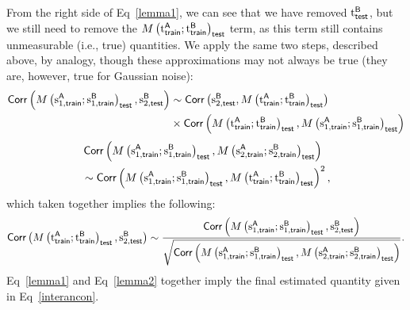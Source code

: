 From the right side of Eq~\eqref{lemma1}, we can see that we have removed $\trueBtest$, but we still need to remove the $M\left(\trueA;\trueB\right)_{\test}$ term, as this term still contains unmeasurable (i.e., true) quantities.
We apply the same two steps, described above, by analogy, though these approximations may not always be true (they are, however, true for Gaussian noise):
\begin{equation*}
\begin{split}
\corr\left(M\left(\sfAtrain;\sfBtrain\right)_{\test}, \ssBtest\right) & \sim \corr\left(\ssBtest, M\left(\trueA;\trueB\right)_{\test}\right) \\
& \times \corr\left(M\left(\trueA;\trueB\right)_{\test}, M\left(\sfAtrain;\sfBtrain\right)_{\test}\right)
\end{split}
\end{equation*}
\begin{equation*}
\begin{split}
& \corr\left(M\left(\sfAtrain;\sfBtrain\right)_{\test}, M\left(\ssAtrain;\ssBtrain\right)_{\test}\right) \\
& \sim \corr\left(M\left(\sfAtrain;\sfBtrain\right)_{\test}, M\left(\trueA;\trueB\right)_{\test}\right)^2,
\end{split}
\end{equation*}
which taken together implies the following:
\begin{equation}\label{lemma2}
\corr\left(M\left(\trueA;\trueB\right)_{\test}, \ssBtest\right) \sim \dfrac{\corr\left(M\left(\sfAtrain;\sfBtrain\right)_{\test}, \ssBtest\right)}{\sqrt{\corr\left(M\left(\sfAtrain;\sfBtrain\right)_{\test}, M\left(\ssAtrain;\ssBtrain\right)_{\test}\right)}}.
\end{equation}
Eq~\eqref{lemma1} and Eq~\eqref{lemma2} together imply the final estimated quantity given in Eq~\eqref{interancon}.

